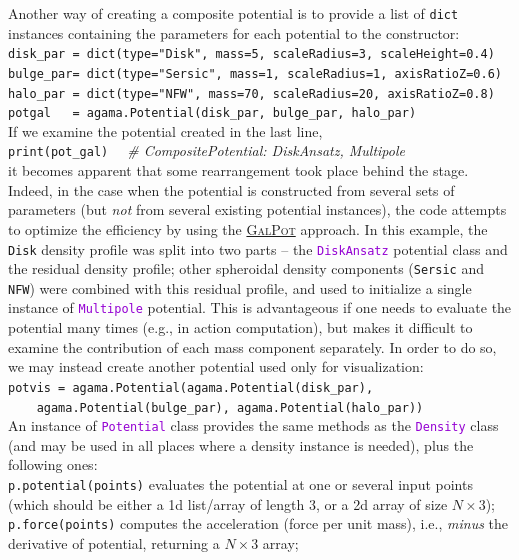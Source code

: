 \documentclass[12pt]{article}
\newcommand{\ttt}[1]{\textcolor{darkviolet}{\texttt{#1}}}
\newcommand{\ppp}[1]{\textcolor{darkolive} {\texttt{#1}}}
\begin{document}
Another way of creating a composite potential is to provide a list of \texttt{dict} instances containing the parameters for each potential to the constructor:\\
\texttt{disk_par = dict(type="Disk", mass=5, scaleRadius=3, scaleHeight=0.4)}\\
\texttt{bulge_par= dict(type="Sersic", mass=1, scaleRadius=1, axisRatioZ=0.6)}\\
\texttt{halo_par = dict(type="NFW", mass=70, scaleRadius=20, axisRatioZ=0.8)}\\
\texttt{potgal~~~= agama.Potential(disk_par, bulge_par, halo_par)}\\[2mm]
If we examine the potential created in the last line,\\
\texttt{print(pot_gal)}  \textit{\color{Sepia} \ \ \# CompositePotential: DiskAnsatz, Multipole}\\
it becomes apparent that some rearrangement took place behind the stage. Indeed, in the case when the potential is constructed from several sets of parameters (but \textit{not} from several existing potential instances), the code attempts to optimize the efficiency by using the \hyperref[sec:PotentialGalpot]{\textsc{GalPot}} approach. In this example, the \ppp{Disk} density profile was split into two parts -- the \ttt{DiskAnsatz} potential class and the residual density profile; other spheroidal density components (\ppp{Sersic} and \ppp{NFW}) were combined with this residual profile, and used to initialize a single instance of \ttt{Multipole} potential. This is advantageous if one needs to evaluate the potential many times (e.g., in action computation), but makes it difficult to examine the contribution of each mass component separately. In order to do so, we may instead create another potential used only for visualization:\\
\texttt{potvis~= agama.Potential(agama.Potential(disk_par), }\\
\texttt{\mbox{}~~~~agama.Potential(bulge_par), agama.Potential(halo_par))}\\[2mm]
An instance of \ttt{Potential} class provides the same methods as the \ttt{Density} class (and may be used in all places where a density instance is needed), plus the following ones:\\
\texttt{p.potential(points)} evaluates the potential at one or several input points (which should be either a 1d list/array of length 3, or a 2d array of size $N\times3$);\\
\texttt{p.force(points)} computes the acceleration (force per unit mass), i.e., \textit{minus} the derivative of potential, returning a $N\times3$ array;\\
\end{document}
